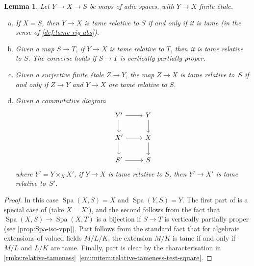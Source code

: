 \documentclass[a4paper,twoside,11pt,reqno]{amsart}
\DeclareMathOperator{\Spa}{Spa}
\newtheorem{lem}[thm]{Lemma}
\theoremstyle{definition}
\numberwithin{equation}{subsection}
\begin{document}
\begin{lem} \label{lem:properties-tameness-relative-S}
    Let $Y\to X\to S$ be maps of adic spaces, with $Y\to X$ finite \'etale. 
    \begin{enumerate}[(a)]
        \item \label{lemitem:sorite-tameness-relative-S1}
        If $X=S$, then $Y\to X$ is tame relative to $S$ if and only if it is tame (in the sense of \cref{def:tame-rig-abs}).
        \item \label{lemitem:sorite-tameness-relative-S2}
        Given a map $S\to T$, if $Y\to X$ is tame relative to $T$, then it is tame relative to $S$. The converse holds if $S\to T$ is vertically partially proper.
        \item 
        \label{lemitem:sorite-tameness-relative-S3}
        Given a surjective finite \'etale $Z\to Y$, the map $Z \to X$ is tame relative to~$S$ if and only if $Z\to Y$ and $Y\to X$ are tame relative to $S$. 
        \item 
        \label{lemitem:sorite-tameness-relative-S4}
        Given a commutative diagram
        \[ 
            \begin{tikzcd}
                Y'\ar[r] \ar[d] & Y \ar[d] \\
                X'\ar[r] \ar[d] & X \ar[d] \\
                S'\ar[r]  & S
            \end{tikzcd}
        \]
        where $Y' = Y\times_X X'$, if $Y\to X$ is tame relative to $S$, then $Y'\to X'$ is tame relative to~$S'$.
    \end{enumerate}    
\end{lem}

\begin{proof}
 In this case $\Spa(X, S) = X$ and $\Spa(Y,S) = Y$.
The first part of  is a special case of  (take  $X=X'$), and the second follows from the fact that $\Spa(X, S)\to \Spa(X, T)$ is a bijection if $S\to T$ is vertically partially proper (see \cref{prop:Spa-iso-vpp}).
Part  follows from the standard fact that for algebraic extensions of valued fields $M/L/K$, the extension $M/K$ is tame if and only if $M/L$ and $L/K$ are tame. Finally, part  is clear by the characterisation in \cref{rmks:relative-tameness}~\ref{enumitem:relative-tameness-test-square}.
\end{proof}
\end{document}
